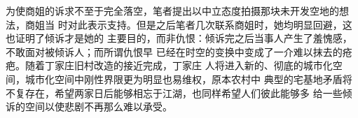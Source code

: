 为使商姐的诉求不至于完全落空，笔者提出以中立态度拍摄那块未开发空地的想法，商姐当
时对此表示支持。但是之后笔者几次联系商姐时，她均明显回避，这也证明了倾诉才是她的
主要目的，而非仇恨：倾诉完之后当事人产生了羞愧感，不敢面对被倾诉人；而所谓仇恨早
已经在时空的变换中变成了一介难以抹去的疮疤。随着丁家庄旧村改造的接近完成，丁家庄
人将进入新的、彻底的城市化空间，城市化空间中刚性界限更为明显也易维权，原本农村中
典型的宅基地矛盾将不复存在，希望两家日后能够相忘于江湖，也同样希望人们彼此能够多
给一些倾诉的空间以使悲剧不再那么难以承受。



